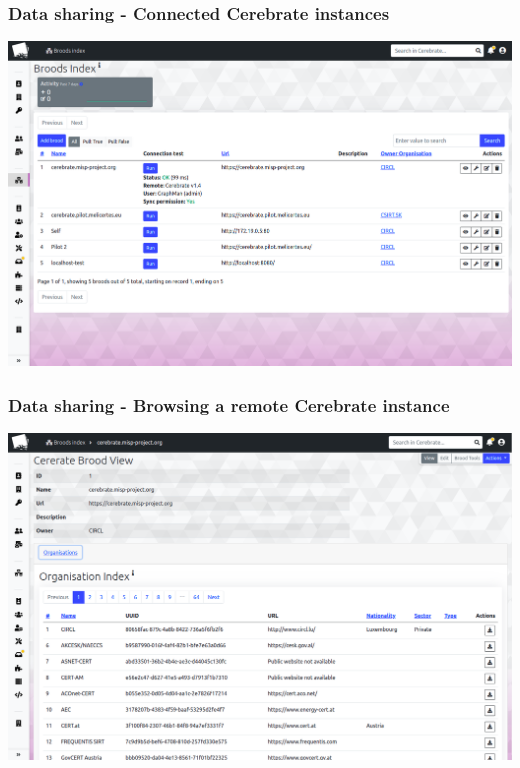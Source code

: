 \begin{frame}
\frametitle{Data sharing - Connected Cerebrate instances}
    \begin{center}
        \includegraphics[width=0.95\linewidth]{pictures/brood-index.png}
    \end{center}
\end{frame}

\begin{frame}
\frametitle{Data sharing - Browsing a remote Cerebrate instance}
    \begin{center}
        \includegraphics[width=0.95\linewidth]{pictures/brood-view.png}
    \end{center}
\end{frame}

